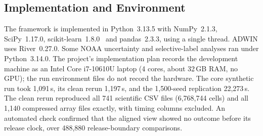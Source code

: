 \subsection{Implementation and Environment}
\label{sec:setup-impl}
The framework is implemented in Python~3.13.5 with NumPy~2.1.3, SciPy~1.17.0,
scikit-learn~1.8.0~\cite{pedregosa2011scikit} and pandas~2.3.3, using a single
thread. ADWIN uses River~0.27.0. Some NOAA uncertainty and selective-label analyses
ran under Python~3.14.0. The project's implementation plan records the development
machine as an Intel Core i7-10610U laptop (4 cores, about 32\,GB RAM, no GPU); the run
environment files do not record the hardware. The core synthetic run took 1,091\,s,
its clean rerun 1,197\,s, and the 1,500-seed replication 22,273\,s. The clean rerun
reproduced all 741 scientific CSV files (6,768,744 cells) and all 1,140 compressed array
files exactly, with timing columns excluded. An automated check confirmed
that the aligned view showed no outcome before its release clock, over 488,880
release-boundary comparisons.
